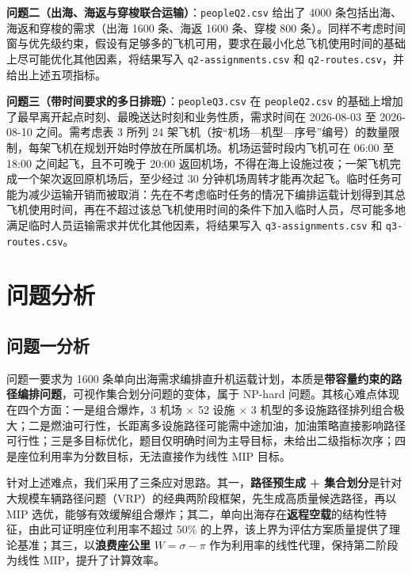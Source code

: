 \documentclass[withoutpreface]{cumcmthesis}
\begin{document}
\textbf{问题二（出海、海返与穿梭联合运输）}：\texttt{peopleQ2.csv} 给出了 4000 条包括出海、海返和穿梭的需求（出海 1600 条、海返 1600 条、穿梭 800 条）。同样不考虑时间窗与优先级约束，假设有足够多的飞机可用，要求在最小化总飞机使用时间的基础上尽可能优化其他因素，将结果写入 \texttt{q2-assignments.csv} 和 \texttt{q2-routes.csv}，并给出上述五项指标。

\textbf{问题三（带时间要求的多日排班）}：\texttt{peopleQ3.csv} 在 \texttt{peopleQ2.csv} 的基础上增加了最早离开起点时刻、最晚送达时刻和业务性质，需求时间在 2026-08-03 至 2026-08-10 之间。需考虑表 3 所列 24 架飞机（按“机场—机型—序号”编号）的数量限制，每架飞机在规划开始时停放在所属机场。机场运营时段内飞机可在 06:00 至 18:00 之间起飞，且不可晚于 20:00 返回机场，不得在海上设施过夜；一架飞机完成一个架次返回原机场后，至少经过 30 分钟机场周转才能再次起飞。临时任务可能为减少运输开销而被取消：先在不考虑临时任务的情况下编排运载计划得到其总飞机使用时间，再在不超过该总飞机使用时间的条件下加入临时人员，尽可能多地满足临时人员运输需求并优化其他因素，将结果写入 \texttt{q3-assignments.csv} 和 \texttt{q3-routes.csv}。

\section{问题分析}

\subsection{问题一分析}

问题一要求为 1600 条单向出海需求编排直升机运载计划，本质是\textbf{带容量约束的路径编排问题}，可视作集合划分问题\cite{balas1976}的变体，属于 NP-hard 问题。其核心难点体现在四个方面：一是组合爆炸，3 机场 $\times$ 52 设施 $\times$ 3 机型的多设施路径排列组合极大；二是燃油可行性，长距离多设施路径可能需中途加油，加油策略直接影响路径可行性；三是多目标优化，题目仅明确时间为主导目标，未给出二级指标次序；四是座位利用率为分数目标，无法直接作为线性 MIP 目标。

针对上述难点，我们采用了三条应对思路。其一，\textbf{路径预生成 + 集合划分}\cite{balas1976}是针对大规模车辆路径问题（VRP）的经典两阶段框架\cite{hu2018}，先生成高质量候选路径，再以 MIP 选优，能够有效缓解组合爆炸；其二，单向出海存在\textbf{返程空载}的结构性特征，由此可证明座位利用率不超过 50\% 的上界，该上界为评估方案质量提供了理论基准；其三，以\textbf{浪费座公里} $W = \sigma - \pi$ 作为利用率的线性代理，保持第二阶段为线性 MIP，提升了计算效率。
\end{document}
